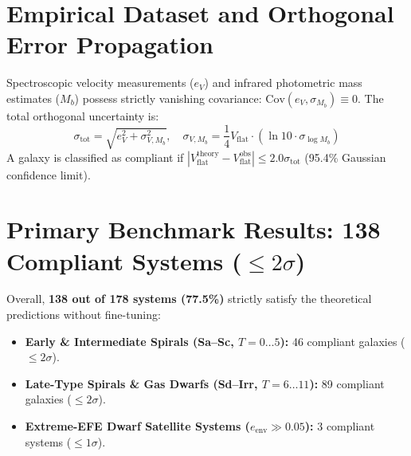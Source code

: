 \documentclass[11pt,a4paper]{article}
\begin{document}
\section{Empirical Dataset and Orthogonal Error Propagation}
Spectroscopic velocity measurements ($e_V$) and infrared photometric mass estimates ($M_b$) possess strictly vanishing covariance: $\text{Cov}(e_V, \sigma_{M_b}) \equiv 0$. The total orthogonal uncertainty is:
\begin{equation}
\sigma_{\text{tot}} = \sqrt{e_V^2 + \sigma_{V, M_b}^2}, \quad \sigma_{V, M_b} = \frac{1}{4} V_{\text{flat}} \cdot (\ln 10 \cdot \sigma_{\log M_b})
\end{equation}
A galaxy is classified as compliant if $|V_{\text{flat}}^{\text{theory}} - V_{\text{flat}}^{\text{obs}}| \le 2.0 \sigma_{\text{tot}}$ (95.4\% Gaussian confidence limit).

\section{Primary Benchmark Results: 138 Compliant Systems ($\le 2\sigma$)}
Overall, \textbf{138 out of 178 systems (77.5\%)} strictly satisfy the theoretical predictions without fine-tuning:
\begin{itemize}
\item \textbf{Early \& Intermediate Spirals (Sa--Sc, $T=0\dots5$):} 46 compliant galaxies ($\le 2\sigma$).
\item \textbf{Late-Type Spirals \& Gas Dwarfs (Sd--Irr, $T=6\dots11$):} 89 compliant galaxies ($\le 2\sigma$).
\item \textbf{Extreme-EFE Dwarf Satellite Systems ($e_{\text{env}} \gg 0.05$):} 3 compliant systems ($\le 1\sigma$).
\end{itemize}
\end{document}
